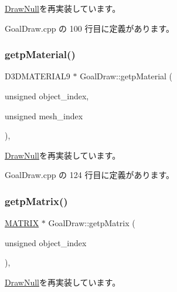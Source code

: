 \mbox{\hyperlink{class_draw_null_a7586cc78eed6bcaf2972ad7a6a70e665}{Draw\+Null}}を再実装しています。



 Goal\+Draw.\+cpp の 100 行目に定義があります。

\mbox{\label{class_goal_draw_ae7f45a84006809475aba8d9ce1b1f8a5}} 
\subsubsection{\texorpdfstring{getp\+Material()}{getpMaterial()}}
{\footnotesize\ttfamily D3\+D\+M\+A\+T\+E\+R\+I\+A\+L9 $\ast$ Goal\+Draw\+::getp\+Material (\begin{DoxyParamCaption}\item[{unsigned}]{object\+\_\+index,  }\item[{unsigned}]{mesh\+\_\+index }\end{DoxyParamCaption})\hspace{0.3cm}{\ttfamily [override]}, {\ttfamily [virtual]}}



\mbox{\hyperlink{class_draw_null_aa07d7e89e723b68ec257da0f63d43f70}{Draw\+Null}}を再実装しています。



 Goal\+Draw.\+cpp の 124 行目に定義があります。

\mbox{\label{class_goal_draw_a536a23c043576f9032e6651d7644d038}} 
\subsubsection{\texorpdfstring{getp\+Matrix()}{getpMatrix()}}
{\footnotesize\ttfamily \mbox{\hyperlink{_vector3_d_8h_a032295cd9fb1b711757c90667278e744}{M\+A\+T\+R\+IX}} $\ast$ Goal\+Draw\+::getp\+Matrix (\begin{DoxyParamCaption}\item[{unsigned}]{object\+\_\+index }\end{DoxyParamCaption})\hspace{0.3cm}{\ttfamily [override]}, {\ttfamily [virtual]}}



\mbox{\hyperlink{class_draw_null_a001901c340671106a33d44b9d4aef4c4}{Draw\+Null}}を再実装しています。



